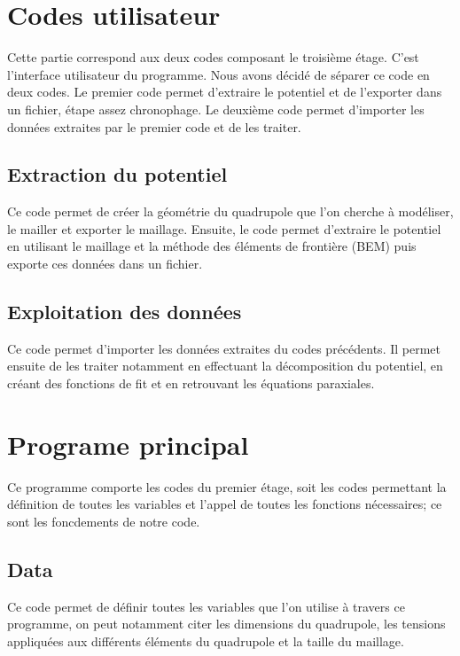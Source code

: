 \documentclass{report}
\begin{document}
\section{Codes utilisateur}
Cette partie correspond aux deux codes composant le troisième étage. C'est l'interface utilisateur du programme.
Nous avons décidé de séparer ce code en deux codes. Le premier code permet d'extraire le potentiel et de l'exporter dans un fichier, étape assez chronophage. 
Le deuxième code permet d'importer les données extraites par le premier code et de les traiter. 

\subsection{Extraction du potentiel}
Ce code permet de créer la géométrie du quadrupole que l'on cherche à modéliser, le mailler et exporter le maillage. Ensuite, le code permet d'extraire le 
potentiel en utilisant le maillage et la méthode des éléments de frontière (BEM) puis exporte ces données dans un fichier.


\subsection{Exploitation des données}
Ce code permet d'importer les données extraites du codes précédents. Il permet ensuite de les traiter notamment en effectuant la décomposition du potentiel, 
en créant des fonctions de fit et en retrouvant les équations paraxiales.

\section{Programe principal}
Ce programme comporte les codes du premier étage, soit les codes permettant la définition de toutes les variables et l'appel de toutes les fonctions nécessaires;
ce sont les foncdements de notre code.
\subsection{Data}
Ce code permet de définir toutes les variables que l'on utilise à travers ce programme, on peut notamment citer les dimensions du quadrupole, 
les tensions appliquées aux différents éléments du quadrupole et la taille du maillage.

\end{document}
